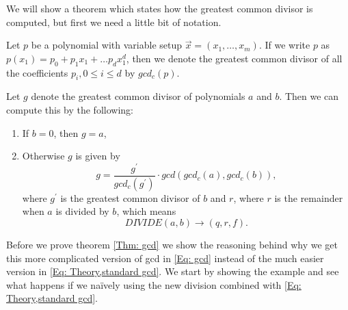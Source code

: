 We will show a theorem which states how the greatest common divisor is computed, but first we need a little bit of notation.
\begin{definition}
  Let $p$ be a polynomial with variable setup $\vec{x}=(x_1,\ldots,x_m)$. If we write $p$ as $p(x_1)=p_0+p_1x_1+\ldots p_dx_1^d$, then we denote the greatest common divisor of all the coefficients $p_i, 0\leq i\leq d$ by $gcd_c(p)$.
\end{definition}
\begin{theorem}\label{Thm: gcd}
  Let $g$ denote the greatest common divisor of polynomials $a$ and $b$. Then we can compute this by the following:
  \begin{enumerate}
    \item If $b=0$, then $g=a$,
    \item Otherwise $g$ is given by
    \begin{equation}\label{Eq: gcd}
      g=\frac{g^\prime}{gcd_c(g^\prime)}\cdot gcd(gcd_c(a),gcd_c(b)),
    \end{equation}
    where $g^\prime$ is the greatest common divisor of $b$ and $r$, where $r$ is the remainder when $a$ is divided by $b$, which means
    \begin{equation}
      DIVIDE(a,b) \rightarrow (q,r,f).
    \end{equation}
  \end{enumerate}
\end{theorem}
Before we prove theorem \ref{Thm: gcd} we show the reasoning behind why we get this more complicated version of gcd in \ref{Eq: gcd} instead of the much easier version in \ref{Eq: Theory,standard gcd}. We start by showing the example and see what happens if we naïvely using the new division combined with \ref{Eq: Theory,standard gcd}.
